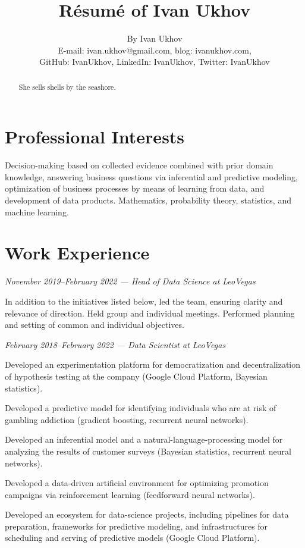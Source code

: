 \documentclass[journal]{IEEEtran}
\title{Résumé of Ivan Ukhov}
\author{
  By Ivan Ukhov\\
  E-mail: ivan.ukhov@gmail.com, blog: ivanukhov.com,\\
  GitHub: IvanUkhov, LinkedIn: IvanUkhov, Twitter: IvanUkhov%
}
\begin{document}
\maketitle

\begin{abstract}
She sells shells by the seashore.
\end{abstract}

\section{Professional Interests}
Decision-making based on collected evidence combined with prior domain
knowledge, answering business questions via inferential and predictive modeling,
optimization of business processes by means of learning from data, and
development of data products. Mathematics, probability theory, statistics, and
machine learning.

\section{Work Experience}
\emph{November 2019--February 2022 --- Head of Data Science at LeoVegas}

In addition to the initiatives listed below, led the team, ensuring clarity and
relevance of direction. Held group and individual meetings. Performed planning
and setting of common and individual objectives.

\emph{February 2018--February 2022 --- Data Scientist at LeoVegas}

Developed an experimentation platform for democratization and decentralization
of hypothesis testing at the company (Google Cloud Platform, Bayesian
statistics).

Developed a predictive model for identifying individuals who are at risk of
gambling addiction (gradient boosting, recurrent neural networks).

Developed an inferential model and a natural-language-processing model for
analyzing the results of customer surveys (Bayesian statistics, recurrent neural
networks).

Developed a data-driven artificial environment for optimizing promotion
campaigns via reinforcement learning (feedforward neural networks).

Developed an ecosystem for data-science projects, including pipelines for data
preparation, frameworks for predictive modeling, and infrastructures for
scheduling and serving of predictive models (Google Cloud Platform).
\end{document}
